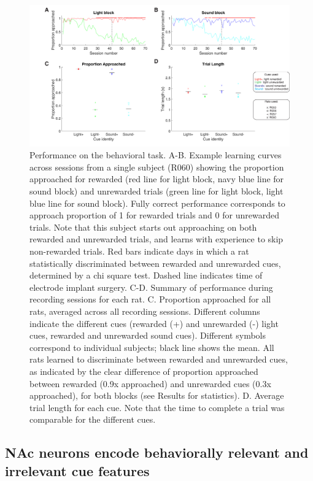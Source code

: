 \documentclass[11pt]{article}
\begin{document}
\begin{figure}[h]
\centering
\includegraphics[width=\textwidth]{Fig 4 - Behavioral results.png}
\caption{Performance on the behavioral task. A-B. Example learning curves across sessions from a single subject (R060) showing the proportion approached for rewarded (red line for light block, navy blue line for sound block) and unrewarded trials (green line for light block, light blue line for sound block). Fully correct performance corresponds to approach proportion of 1 for rewarded trials and 0 for unrewarded trials. Note that this subject starts out approaching on both rewarded and unrewarded trials, and learns with experience to skip non-rewarded trials. Red bars indicate days in which a rat statistically discriminated between rewarded and unrewarded cues, determined by a chi square test. Dashed line indicates time of electrode implant surgery. C-D. Summary of performance during recording sessions for each rat. C. Proportion approached for all rats, averaged across all recording sessions. Different columns indicate the different cues (rewarded (+) and unrewarded (-) light cues, rewarded and unrewarded sound cues). Different symbols correspond to individual subjects; black line shows the mean. All rats learned to discriminate between rewarded and unrewarded cues, as indicated by the clear difference of proportion approached between rewarded (0.9x approached) and unrewarded cues (0.3x approached), for both blocks (see Results for statistics). D. Average trial length for each cue. Note that the time to complete a trial was comparable for the different cues.}
\label{fig:behav}
\end{figure}

\subsection*{NAc neurons encode behaviorally relevant and irrelevant cue features}
\end{document}
